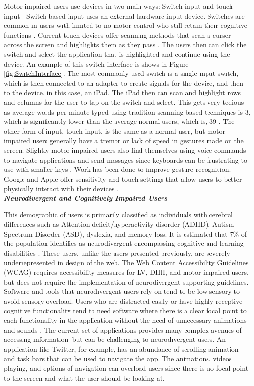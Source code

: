 Motor-impaired users use devices in two main ways: Switch input and touch input \cite{Zhang13}. Switch based input uses an external hardware input device. Switches are common in users with limited to no motor control who still retain their cognitive functions \cite{Zhang13}. Current touch devices offer scanning methods that scan a curser across the screen and highlights them as they pass \cite{AppleAccess,GoogleAccess}. The users then can click the switch and select the application that is highlighted and continue using the device. An example of this switch interface is shows in Figure \ref{fig:SwitchInterface}. The most commonly used switch is a single input switch, which is then connected to an adapter to create signals for the device, and then to the device, in this case, an iPad. The iPad then can scan and highlight rows and columns for the user to tap on the switch and select. This gets very tedious as average words per minute typed using tradition scanning based techniques is 3, which is significantly lower than the average normal users, which is, 39 \cite{MacKenzie11}. The other form of input, touch input, is the same as a normal user, but motor-impaired users generally have a tremor or lack of speed in gestures made on the screen. Slightly motor-impaired users also find themselves using voice commands to navigate applications and send messages since keyboards can be frustrating to use with smaller keys \cite{Zhang13}. Work has been done to improve gesture recognition. Google and Apple offer sensitivity and touch settings that allow users to better physically interact with their devices \cite{Peng19,AppleAccess,GoogleAccess}.\\ 

\noindent \textbf{\textit{Neurodivergent and Cognitively Impaired Users}}

This demographic of users is primarily classified as individuals with cerebral differences such as Attention-deficit/hyperactivity disorder (ADHD), Autism Spectrum Disorder (ASD), dyslexia, and memory loss. It is estimated that 7\% of the population identifies as neurodivergent-encompassing cognitive and learning disabilities \cite{Race21}. These users, unlike the users presented previously, are severely underrepresented in design of the web. The Web Content Accessibility Guidelines (WCAG) \cite{WebGuide} requires accessibility measures for LV, DHH, and motor-impaired users, but does not require the implementation of neurodivergent supporting guidelines. Software and tools that neurodivergent users rely on tend to be low-sensory to avoid sensory overload. Users who are distracted easily or have highly receptive cognitive functionality tend to need software where there is a clear focal point to each functionality in the application without the need of unnecessary animations and sounds \cite{Rudy21}. The current set of applications provides many complex avenues of accessing information, but can be challenging to neurodivergent users. An application like Twitter, for example, has an abundance of scrolling animation and task bars that can be used to navigate the app. The animations, videos playing, and options of navigation can overload users since there is no focal point to the screen and what the user should be looking at. 

